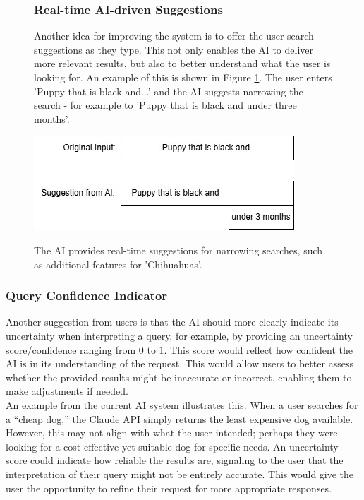 \documentclass[../../submission.tex]{subfiles}
\begin{document}
\begin{figure}[h]
\centering
\begin{minipage}{0.35\textwidth}
    \subsubsection{Real-time AI-driven Suggestions}
    Another idea for improving the system is to offer the user search suggestions as they type. 
    This not only enables the AI to deliver more relevant results, but also to better understand what the user is looking for.
    An example of this is shown in Figure \ref{fig:suggestions}. The user enters 'Puppy that is black and...' and the AI suggests narrowing the 
    search - for example to 'Puppy that is black and under three months'.
\end{minipage}
\hfill
\begin{minipage}{0.55\textwidth}
    \includegraphics[width=\textwidth]{images/vorschlag}
    \caption{The AI provides real-time suggestions for narrowing searches, such as additional features for 'Chihuahuas'.}
    \Description{}
    \label{fig:suggestions}
\end{minipage}
\end{figure}
 

 
 \subsubsection{Query Confidence Indicator}   
 
 Another suggestion from users is that the AI should more clearly indicate its uncertainty 
 when interpreting a query, for example, by providing an uncertainty score/confidence ranging from 
 0 to 1. This score would reflect how confident the AI is in its understanding of the 
 request. This would allow users to better assess whether the provided results might 
 be inaccurate or incorrect, enabling them to make adjustments if needed.\\
 An example from the current AI system illustrates this. When a user searches for 
 a “cheap dog,” the Claude API simply returns the least expensive dog available. 
 However, this may not align with what the user intended; perhaps they were looking 
 for a cost-effective yet suitable dog for specific needs. An uncertainty score could 
 indicate how reliable the results are, signaling to the user that the interpretation 
 of their query might not be entirely accurate. This would give the user the opportunity 
 to refine their request for more appropriate responses.
\end{document}
